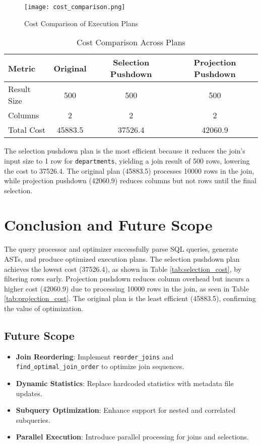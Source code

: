 \documentclass[12pt,a4paper]{article}
\begin{document}
\begin{figure}[H]
    \centering
    \texttt{[image: cost\_comparison.png]}
    \caption{Cost Comparison of Execution Plans}
    \label{fig:cost_comparison}
\end{figure}

\begin{table}[H]
    \centering
    \caption{Cost Comparison Across Plans}
    \begin{tabular}{lccc}
        \toprule
        Metric & Original & Selection Pushdown & Projection Pushdown \\
        \midrule
        Result Size & 500 & 500 & 500 \\
        Columns & 2 & 2 & 2 \\
        Total Cost & 45883.5 & 37526.4 & 42060.9 \\
        \bottomrule
    \end{tabular}
    \label{tab:cost_comparison}
\end{table}

The selection pushdown plan is the most efficient because it reduces the join’s input size to 1 row for \texttt{departments}, yielding a join result of 500 rows, lowering the cost to 37526.4. The original plan (45883.5) processes 10000 rows in the join, while projection pushdown (42060.9) reduces columns but not rows until the final selection.
\newpage
\section{Conclusion and Future Scope}
The query processor and optimizer successfully parse SQL queries, generate ASTs, and produce optimized execution plans. The selection pushdown plan achieves the lowest cost (37526.4), as shown in Table \ref{tab:selection_cost}, by filtering rows early. Projection pushdown reduces column overhead but incurs a higher cost (42060.9) due to processing 10000 rows in the join, as seen in Table \ref{tab:projection_cost}. The original plan is the least efficient (45883.5), confirming the value of optimization.

\subsection{Future Scope}
\begin{itemize}
    \item \textbf{Join Reordering}: Implement \texttt{reorder\_joins} and \texttt{find\_optimal\_join\_order} to optimize join sequences.
    \item \textbf{Dynamic Statistics}: Replace hardcoded statistics with metadata file updates.
    \item \textbf{Subquery Optimization}: Enhance support for nested and correlated subqueries.
    \item \textbf{Parallel Execution}: Introduce parallel processing for joins and selections.
    
\end{itemize}
\end{document}
